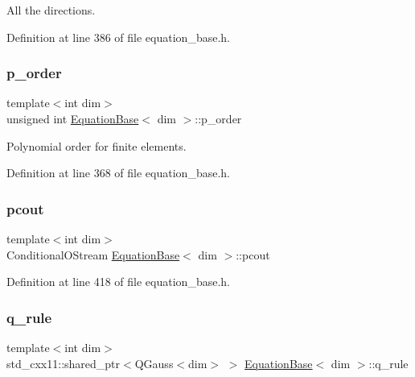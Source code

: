 All the directions. 



Definition at line 386 of file equation\+\_\+base.\+h.

\mbox{\label{class_equation_base_a0facd1cc5977e32b301a134ed5b9fa98}} 
\subsubsection{\texorpdfstring{p\+\_\+order}{p\_order}}
{\footnotesize\ttfamily template$<$int dim$>$ \\
unsigned int \hyperlink{class_equation_base}{Equation\+Base}$<$ dim $>$\+::p\+\_\+order\hspace{0.3cm}{\ttfamily [protected]}}



Polynomial order for finite elements. 



Definition at line 368 of file equation\+\_\+base.\+h.

\mbox{\label{class_equation_base_a12dd28de05c41d4dd3ec30e7195bfa97}} 
\subsubsection{\texorpdfstring{pcout}{pcout}}
{\footnotesize\ttfamily template$<$int dim$>$ \\
Conditional\+O\+Stream \hyperlink{class_equation_base}{Equation\+Base}$<$ dim $>$\+::pcout\hspace{0.3cm}{\ttfamily [protected]}}



Definition at line 418 of file equation\+\_\+base.\+h.

\mbox{\label{class_equation_base_a5e677b436f1abeeeffc3da284e5c1c4c}} 
\subsubsection{\texorpdfstring{q\+\_\+rule}{q\_rule}}
{\footnotesize\ttfamily template$<$int dim$>$ \\
std\+\_\+cxx11\+::shared\+\_\+ptr$<$Q\+Gauss$<$dim$>$ $>$ \hyperlink{class_equation_base}{Equation\+Base}$<$ dim $>$\+::q\+\_\+rule\hspace{0.3cm}{\ttfamily [protected]}}



